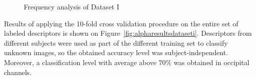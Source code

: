 \begin{figure}[h!]
\centering
{}
\caption[Power Spectral Density of the Dataset I]{Frequency analysis of Dataset I}
\label{fig:psd}
\end{figure}
   
Results of applying the 10-fold cross validation procedure on the entire set of labeled descriptors is shown on Figure~\ref{fig:alpharesultsdataseti}.  Descriptors from different subjects were used as part of the different training set to classify unknown images, so the obtained accuracy level was subject-independent.  Moreover, a classification level with average above $70\%$ was obtained in occipital channels.
   
